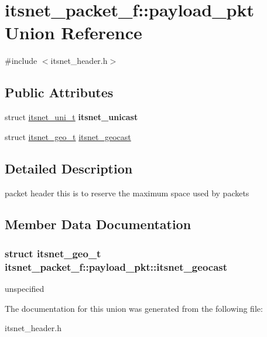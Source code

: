 \hypertarget{unionitsnet__packet__f_1_1payload__pkt}{\section{itsnet\-\_\-packet\-\_\-f\-:\-:payload\-\_\-pkt \-Union \-Reference}
\label{unionitsnet__packet__f_1_1payload__pkt}
}


{\ttfamily \#include $<$itsnet\-\_\-header.\-h$>$}

\subsection*{\-Public \-Attributes}
\begin{DoxyCompactItemize}
\item 
\hypertarget{unionitsnet__packet__f_1_1payload__pkt_af4cc0e1aead6059f7ac00f772e84d386}{struct \hyperlink{structitsnet__uni__t}{itsnet\-\_\-uni\-\_\-t} {\bfseries itsnet\-\_\-unicast}}\label{unionitsnet__packet__f_1_1payload__pkt_af4cc0e1aead6059f7ac00f772e84d386}

\item 
struct \hyperlink{structitsnet__geo__t}{itsnet\-\_\-geo\-\_\-t} \hyperlink{unionitsnet__packet__f_1_1payload__pkt_af6d92d444cb451787e74abd4cd8f9742}{itsnet\-\_\-geocast}
\end{DoxyCompactItemize}


\subsection{\-Detailed \-Description}
packet header this is to reserve the maximum space used by packets 

\subsection{\-Member \-Data \-Documentation}
\hypertarget{unionitsnet__packet__f_1_1payload__pkt_af6d92d444cb451787e74abd4cd8f9742}{
\subsubsection[{itsnet\-\_\-geocast}]{\setlength{\rightskip}{0pt plus 5cm}struct {\bf itsnet\-\_\-geo\-\_\-t} {\bf itsnet\-\_\-packet\-\_\-f\-::payload\-\_\-pkt\-::itsnet\-\_\-geocast}}}\label{unionitsnet__packet__f_1_1payload__pkt_af6d92d444cb451787e74abd4cd8f9742}
unspecified 

\-The documentation for this union was generated from the following file\-:\begin{DoxyCompactItemize}
\item 
itsnet\-\_\-header.\-h\end{DoxyCompactItemize}
